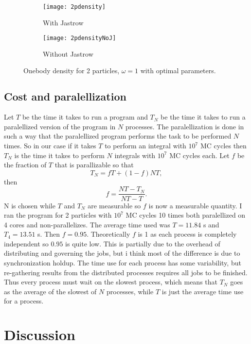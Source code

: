 \documentclass[a4paper,English,10pt]{article}
\newcommand{\be}{\begin{equation}}
\newcommand{\ee}{\end{equation}}
\newcommand{\f}{\frac}
\begin{document}
\begin{figure}
  \centering
  \begin{subfigure}{0.5\textwidth}
    \centering
    \texttt{[image: 2pdensity]}
    \caption{With Jastrow}
    \label{fig:inclu}
  \end{subfigure}%
  \begin{subfigure}{0.5\textwidth}
    \centering
    \texttt{[image: 2pdensityNoJ]}
    \caption{Without Jastrow}
    \label{fig:deform}
  \end{subfigure}
  \caption{Onebody density for 2 particles, $\omega = 1$ with optimal parameters.}
  \label{fig:onebody}
\end{figure}



\subsection{Cost and paralellization}

Let $T$ be the time it takes to run a program and $T_N$ be the time it takes to run a paralellized version of the program in $N$ processes.
The paralellization is done in such a way that the paralellized program performs the task to be performed $N$ times. So in our case
if it takes $T$ to perform an integral with $10^7$ MC cycles then $T_N$ is the time it takes to perform $N$ integrals with $10^7$ MC cycles each.
Let $f$ be the fraction of $T$ that is parallizable so that
\be
T_N = fT + (1-f)NT,
\ee
then
\be
f = \f{NT - T_N}{NT-T}.
\ee
N is chosen while $T$ and $T_N$ are measurable so $f$ is now a measurable quantity.
I ran the program for 2 particles with $10^7$ MC cycles 10 times both paralellized on 4 cores and non-parallelizes.
The average time used was $T = 11.84$ s and $T_4 = 13.51$ s. Then $f = 0.95$.
Theoretically $f$ is 1 as each process is completely independent so $0.95$ is quite low. This is partially due to the overhead of distributing and governing the jobs,
but i think most of the difference is due to synchronization holdup. The time use for each process has some variability, but re-gathering results from the distributed processes
requires all jobs to be finished. Thus every process must wait on the slowest process, which means that  $T_N$ goes as the average of the slowest of $N$ processes, while $T$ is
just the average time use for a process.

\section{Discussion}
\end{document}
